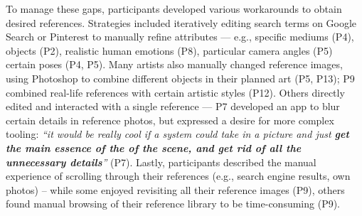 To manage these gaps, participants developed various workarounds to obtain desired references. Strategies included iteratively editing search terms on Google Search or Pinterest to manually refine attributes --- e.g., specific mediums (P4), objects (P2), realistic human emotions (P8), particular camera angles (P5) certain poses (P4, P5). 
Many artists also manually changed reference images, using Photoshop to combine different objects in their planned art (P5, P13); P9 combined real-life references with certain artistic styles (P12). Others directly edited and interacted with a single reference  --- P7 developed an app to blur certain details in reference photos, but expressed a desire for more complex tooling: \textit{``it would be really cool if a system could take in a picture and just \textbf{get the main essence of the of the scene, and get rid of all the unnecessary details}''} (P7).
Lastly, participants described the manual experience of scrolling through their references (e.g., search engine results, own photos) -- while some enjoyed revisiting all their reference images (P9), others found manual browsing of their reference library to be time-consuming (P9).   



